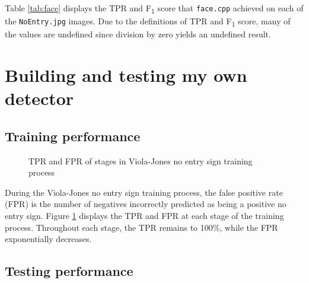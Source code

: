 \documentclass[twocolumn, 10pt, a4paper]{article}
\begin{document}
Table \ref{tab:face} displays the TPR and F\textsubscript{1} score that \texttt{face.cpp} achieved on each of the \texttt{NoEntry\textasteriskcentered.jpg} images.
Due to the definitions of TPR and F\textsubscript{1} score, many of the values are undefined since division by zero yields an undefined result.

\clearpage

\section{Building and testing my own detector}

\subsection{Training performance}

\begin{figure}[h]
  \dataset
  \caption{TPR and FPR of stages in Viola-Jones no entry sign training process}\label{vj_training}
\end{figure}

During the Viola-Jones no entry sign training process, the false positive rate (FPR) is the number of negatives incorrectly predicted as being a positive no entry sign.
Figure \ref{vj_training} displays the TPR and FPR at each stage of the training process.
Throughout each stage, the TPR remains to 100\%, while the FPR exponentially decreases.
 
\subsection{Testing performance}
\end{document}
